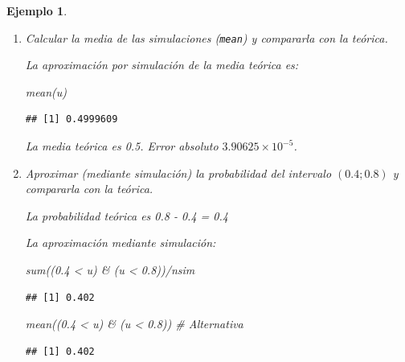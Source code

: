 \documentclass[
]{book}
\newenvironment{Shaded}{\begin{snugshade}}{\end{snugshade}}
\newcommand{\CommentTok}[1]{\textcolor[rgb]{0.56,0.35,0.01}{\textit{#1}}}
\newcommand{\FloatTok}[1]{\textcolor[rgb]{0.00,0.00,0.81}{#1}}
\newcommand{\FunctionTok}[1]{\textcolor[rgb]{0.00,0.00,0.00}{#1}}
\newcommand{\NormalTok}[1]{#1}
\newcommand{\SpecialCharTok}[1]{\textcolor[rgb]{0.00,0.00,0.00}{#1}}
\theoremstyle{break}
\newtheorem{example}{Ejemplo}[chapter]
\theoremstyle{nonumberplain}
\begin{document}
\begin{example}
\begin{enumerate}
  En este caso concreto la distribución de los valores generados es aparentemente más uniforme de lo que cabría esperar, lo que induciría a sospechar de la calidad de este generador (ver Ejemplo \ref{exm:congru512b} en Sección \ref{calgen}).
\item
  Calcular la media de las simulaciones (\texttt{mean}) y compararla con
  la teórica.

  La aproximación por simulación de la media teórica es:

\begin{Shaded}
\begin{Highlighting}[]
\FunctionTok{mean}\NormalTok{(u)}
\end{Highlighting}
\end{Shaded}

\begin{verbatim}
## [1] 0.4999609
\end{verbatim}

  La media teórica es 0.5.
  Error absoluto \(\ensuremath{3.90625\times 10^{-5}}\).
\item
  Aproximar (mediante simulación) la probabilidad del intervalo
  \((0.4;0.8)\) y compararla con la teórica.

  La probabilidad teórica es 0.8 - 0.4 = 0.4

  La aproximación mediante simulación:

\begin{Shaded}
\begin{Highlighting}[]
\FunctionTok{sum}\NormalTok{((}\FloatTok{0.4} \SpecialCharTok{\textless{}}\NormalTok{ u) }\SpecialCharTok{\&}\NormalTok{ (u }\SpecialCharTok{\textless{}} \FloatTok{0.8}\NormalTok{))}\SpecialCharTok{/}\NormalTok{nsim}
\end{Highlighting}
\end{Shaded}

\begin{verbatim}
## [1] 0.402
\end{verbatim}

\begin{Shaded}
\begin{Highlighting}[]
\FunctionTok{mean}\NormalTok{((}\FloatTok{0.4} \SpecialCharTok{\textless{}}\NormalTok{ u) }\SpecialCharTok{\&}\NormalTok{ (u }\SpecialCharTok{\textless{}} \FloatTok{0.8}\NormalTok{))     }\CommentTok{\# Alternativa}
\end{Highlighting}
\end{Shaded}

\begin{verbatim}
## [1] 0.402
\end{verbatim}
\end{enumerate}

\end{example}
\end{document}
